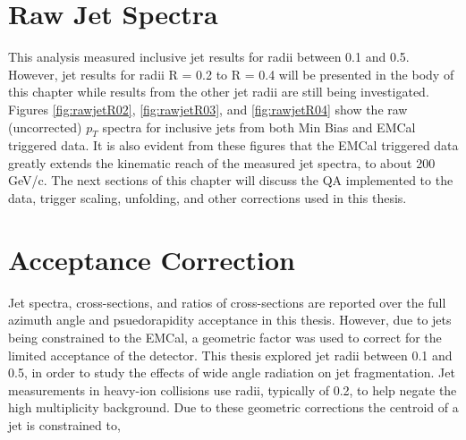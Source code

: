 \section{Raw Jet Spectra}

This analysis measured inclusive jet results for radii between 0.1 and 0.5.  However, jet results for radii R = 0.2 to R = 0.4 will be presented in the body of this chapter while results from the other jet radii are still being investigated.  Figures \ref{fig:rawjetR02}, \ref{fig:rawjetR03}, and \ref{fig:rawjetR04} show the raw (uncorrected) $p_{T}$ spectra for inclusive jets from both Min Bias and EMCal triggered data.  It is also evident from these figures that the EMCal triggered data greatly extends the kinematic reach of the measured jet spectra, to about 200 GeV/c.  The next sections of this chapter will discuss the QA implemented to the data, trigger scaling, unfolding, and other corrections used in this thesis. 



\section{Acceptance Correction}
Jet spectra, cross-sections, and ratios of cross-sections are reported over the full azimuth angle and psuedorapidity acceptance in this thesis.  However, due to jets being constrained to the EMCal, a geometric factor was used to correct for the limited acceptance of the detector.  This thesis explored jet radii between 0.1 and 0.5, in order to study the effects of wide angle radiation on jet fragmentation.  Jet measurements in heavy-ion collisions use radii, typically of 0.2, to help negate the high multiplicity background.  Due to these geometric corrections the centroid of a jet is constrained to,

